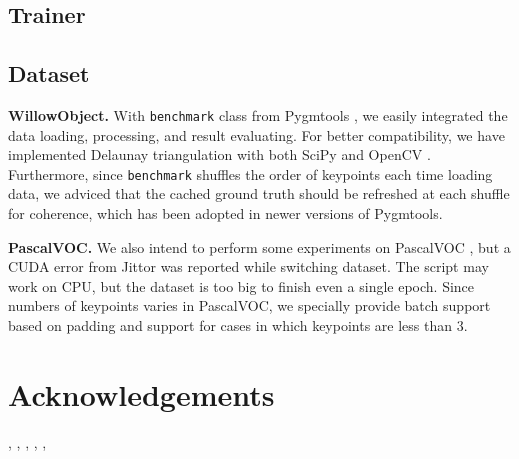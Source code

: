 \documentclass[a4paper]{article}
\begin{document}
\subsection{Trainer}

\subsection{Dataset}
\textbf{WillowObject.}
With \texttt{benchmark} class from Pygmtools \cite{pygmtools}, we easily integrated the data loading, processing, and result evaluating. For better compatibility, we have implemented Delaunay triangulation with both SciPy \cite{scipy} and OpenCV \cite{opencv}. Furthermore, since \texttt{benchmark} shuffles the order of keypoints each time loading data, we adviced that the cached ground truth should be refreshed at each shuffle for coherence, which has been adopted in newer versions of Pygmtools. 

\textbf{PascalVOC.}
We also intend to perform some experiments on PascalVOC \cite{voc1,voc2}, but a CUDA error from Jittor \cite{jittor} was reported while switching dataset. The script may work on CPU, but the dataset is too big to finish even a single epoch. Since numbers of keypoints varies in PascalVOC, we specially provide batch support based on padding and support for cases in which keypoints are less than $3$.

\section{Acknowledgements}

\cite{pca-ipca}, \cite{cie}, \cite{voc1}, \cite{voc2}, \cite{willow}, \cite{vgg}

\newpage 


\end{document}
